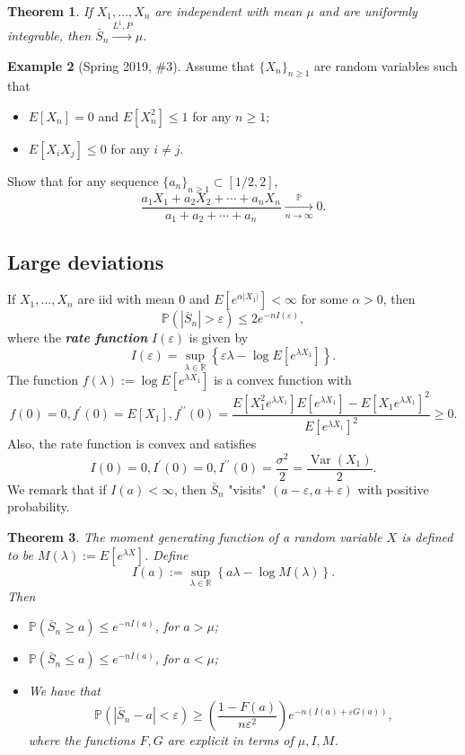 \documentclass[12pt,reqno]{article}
\renewcommand{\emph}[1]{\textit{#1}}
\theoremstyle{plain}
\newtheorem{theorem}{Theorem}[section]
\theoremstyle{definition}
\newtheorem{example}[theorem]{Example}
\begin{document}
\begin{theorem} 
If $X_1,\ldots,X_n$ are independent with mean $\mu$ and are uniformly 
integrable, then $\bar{S}_n \xrightarrow{L^1,P} \mu$. 
\end{theorem}

\begin{example}[Spring 2019, \#3]
Assume that $\{X_n\}_{n \geq 1}$ are random variables such that 
\begin{itemize} 

\item[1.] $E[X_n] = 0$ and $E[X_n^2] \leq 1$ for any $n \geq 1$; 
\item[2.] $E[X_iX_j] \leq 0$ for any $i \neq j$. 

\end{itemize} 
Show that for any sequence $\{a_n\}_{n \geq 1} \subset [1/2,2]$, 
\[
\frac{a_1X_1+a_2X_2+\cdots+a_nX_n}{a_1+a_2+\cdots+a_n} 
     \xrightarrow[n \rightarrow \infty]{\mathbb{P}} 0. 
\]
\end{example} 

\subsection{Large deviations} 

If $X_1,\ldots,X_n$ are iid with mean $0$ and $E[e^{\alpha|X_1|}] < \infty$ 
for some $\alpha > 0$, then 
$$\mathbb{P}(|\bar{S}_n| > \varepsilon) \leq 2e^{-nI(\varepsilon)},$$ 
where the \textbf{\emph{rate function}} $I(\varepsilon)$ is given by 
$$I(\varepsilon) = \sup_{\lambda \in \mathbb{R}} \left\{ 
     \varepsilon\lambda - \log E[e^{\lambda X_1}]\right\}.$$ 
The function $f(\lambda) := \log E[e^{\lambda X_1}]$ is a convex function 
with 
\[
f(0) = 0, f^{\prime}(0) = E[X_1], f^{\prime\prime}(0) = 
     \frac{E[X_1^2 e^{\lambda X_1}] E[e^{\lambda X_1}] - 
     E[X_1 e^{\lambda X_1}]^2}{E[e^{\lambda X_1}]^2} \geq 0. 
\]
Also, the rate function is convex and satisfies 
\[
I(0) = 0, I^{\prime}(0) = 0, I^{\prime\prime}(0) = \frac{\sigma^2}{2} = 
     \frac{\operatorname{Var}(X_1)}{2}. 
\]
We remark that if $I(a) < \infty$, then $\bar{S}_n$ "visits" 
$(a-\varepsilon,a+\varepsilon)$ with positive probability. 

\begin{theorem} 
The \emph{moment generating function} of a random variable $X$ is 
defined to be $M(\lambda) := E[e^{\lambda X}]$. Define 
$$I(a) := \sup_{\lambda \in \mathbb{R}} \left\{a\lambda - 
     \log M(\lambda)\right\}.$$ 
Then 
\begin{itemize} 

\item[(1)] $\mathbb{P}(\bar{S}_n \geq a) \leq e^{-nI(a)}$, for $a > \mu$; 
\item[(2)] $\mathbb{P}(\bar{S}_n \leq a) \leq e^{-nI(a)}$, for $a < \mu$; 
\item[(3)] We have that 
\[
\mathbb{P}(|\bar{S}_n - a| < \varepsilon) \geq \left( 
     \frac{1-F(a)}{n\varepsilon^2}\right) e^{-n(I(a) + \varepsilon G(a))}, 
\]
where the functions $F,G$ are explicit in terms of $\mu,I,M$. 

\end{itemize} 
\end{theorem}  
\end{document}
